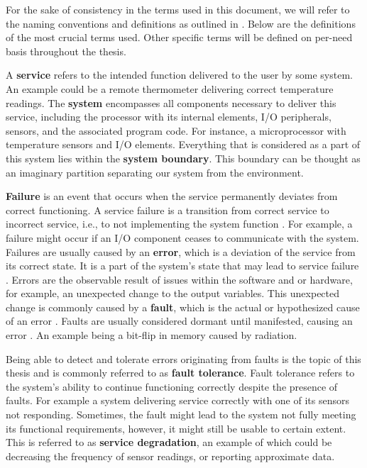 
For the sake of consistency in the terms used in this document, we will refer to the naming conventions and definitions as outlined in \cite{1335465}. Below are the definitions of the most crucial terms used. Other specific terms will be defined on per-need basis throughout the thesis.

A \textbf{service} refers to the intended function delivered to the user by some system. An example could be a remote thermometer delivering correct temperature readings.
The \textbf{system} encompasses all components necessary to deliver this service, including the processor with its internal elements, I/O peripherals, sensors, and the associated program code. For instance, a microprocessor with temperature sensors and I/O elements. 
Everything that is considered as a part of this system lies within the \textbf{system boundary}. This boundary can be thought as an imaginary partition separating our system from the environment.  

\textbf{Failure} is an event that occurs when the service permanently deviates from correct functioning. A service failure is a transition from correct service to incorrect service, i.e., to not implementing the system function \cite{1335465}. For example, a failure might occur if an I/O component ceases to communicate with the system. Failures are usually caused by an \textbf{error}, which is a deviation of the service from its correct state. It is a part of the system's state that may lead to service failure \cite{1335465}. Errors are the observable result of issues within the software and or hardware, for example, an unexpected change to the output variables. This unexpected change is commonly caused by a \textbf{fault}, which is the actual or hypothesized cause of an error \cite{shubu}. Faults are usually considered dormant until manifested, causing an error \cite{1335465}. An example being a bit-flip in memory caused by radiation. 

Being able to detect and tolerate errors originating from faults is the topic of this thesis and is commonly referred to as \textbf{fault tolerance}. Fault tolerance refers to the system's ability to continue functioning correctly despite the presence of faults. For example a system delivering service correctly with one of its sensors not responding. Sometimes, the fault might lead to the system not fully meeting its functional requirements, however, it might still be usable to certain extent. This is referred to as \textbf{service degradation}, an example of which could be decreasing the frequency of sensor readings, or reporting approximate data.